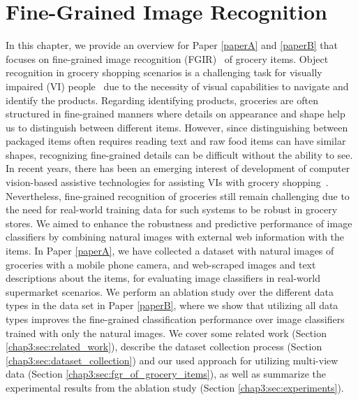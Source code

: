 
\chapter{Fine-Grained Image Recognition}\label{chap3}

In this chapter, we provide an overview for Paper \ref{paperA} and \ref{paperB} that focuses on fine-grained image recognition (FGIR)~\cite{wei2021fine} of grocery items. 
Object recognition in grocery shopping scenarios is a challenging task for visually impaired (VI) people~\cite{brady2013visual,cimarolli2012challenges,szpiro2016finding} due to the necessity of visual capabilities to navigate and identify the products. Regarding identifying products, groceries are often structured in fine-grained manners where details on appearance and shape help us to distinguish between different items. However, since distinguishing between packaged items often requires reading text and raw food items can have similar shapes, recognizing fine-grained details can be difficult without the ability to see. 
In recent years, there has been an emerging interest of development of computer vision-based assistive technologies for assisting VIs with grocery shopping~\cite{lanigan2006trinetra,winlock2010toward,sosa2017hands,boldu2020aisee,zientara2017third,george2015fine}. Nevertheless, fine-grained recognition of groceries still remain challenging due to the need for real-world training data for such systems to be robust in grocery stores. We aimed to enhance the robustness and predictive performance of image classifiers by combining natural images with external web information with the items. In Paper \ref{paperA}, we have collected a dataset with natural images of groceries with a mobile phone camera, and web-scraped images and text descriptions about the items, for evaluating image classifiers in real-world supermarket scenarios. We perform an ablation study over the different data types in the data set in Paper \ref{paperB}, where we show that utilizing all data types improves the fine-grained classification performance over image classifiers trained with only the natural images. We cover some related work (Section \ref{chap3:sec:related_work}), describe the dataset collection process (Section \ref{chap3:sec:dataset_collection}) and our used approach for utilizing multi-view data (Section \ref{chap3:sec:fgr_of_grocery_items}), as well as summarize the experimental results from the ablation study (Section \ref{chap3:sec:experiments}). 


